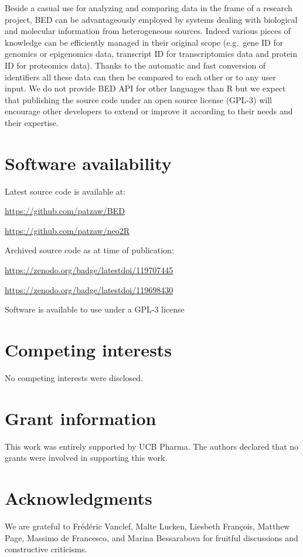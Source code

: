 \documentclass[9pt,a4paper,]{extarticle}
\theoremstyle{definition}
\theoremstyle{definition}
\theoremstyle{definition}
\theoremstyle{remark}
\begin{document}
Beside a casual use for analyzing and comparing data in the frame of a
research project, BED can be advantageously employed by systems dealing with
biological and molecular information from heterogeneous sources.
Indeed various pieces of knowledge can be efficiently managed
in their original scope
(e.g.~gene ID for genomics or epigenomics data, transcript ID
for transcriptomics data and protein ID for proteomics data).
Thanks to the automatic and fast conversion of identifiers all these
data can then be compared to each other or to any user input.
We do not provide BED API for other languages than R but we expect that
publishing the source code under an open source license (GPL-3)
will encourage other developers to extend or improve it according to their
needs and their expertise.

\section{Software availability}\label{software-availability}

Latest source code is available at:

\url{https://github.com/patzaw/BED}

\url{https://github.com/patzaw/neo2R}

Archived source code as at time of publication:

\url{https://zenodo.org/badge/latestdoi/119707445} \citep{godard_patzaw/bed:_2018}

\url{https://zenodo.org/badge/latestdoi/119698430} \citep{godard_patzaw/neo2r:_2018}

Software is available to use under a GPL-3 license

\section{Competing interests}\label{competing-interests}

No competing interests were disclosed.

\section{Grant information}\label{grant-information}

This work was entirely supported by UCB Pharma.
The authors declared that no grants were involved in supporting this work.

\section{Acknowledgments}\label{acknowledgments}

We are grateful to Frédéric Vanclef, Malte Lucken, Liesbeth François,
Matthew Page,
Massimo de Francesco, and Marina Bessarabova for fruitful discussions
and constructive criticisms.

{\small}
\end{document}
